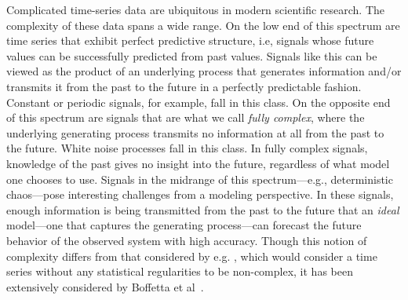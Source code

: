 



%

Complicated time-series data are ubiquitous in modern scientific research.  The
complexity of these data spans a wide range.  On the low end of this spectrum
are time series that exhibit perfect predictive structure, i.e, signals whose
future values can be successfully predicted from past values.  Signals like this
can be viewed as the product of an underlying process that generates information
and/or transmits it from the past to the future in a perfectly predictable
fashion.  Constant or periodic signals, for example, fall in this class.  On the
opposite end of this spectrum are signals that are what we call \emph{fully
complex}, where the underlying generating process transmits no information at
all from the past to the future.  White noise processes fall in this class.  In
fully complex signals, knowledge of the past gives no insight into the future,
regardless of what model one chooses to use. Signals in the midrange of this
spectrum---e.g., deterministic chaos---pose interesting challenges from a
modeling perspective.  In these signals, enough information is being transmitted
from the past to the future that an \emph{ideal} model---one that captures the
generating process---can forecast the future behavior of the observed system
with high accuracy. Though this notion of complexity differs from that
considered by e.g. \cite{Shalizi2008}, which would consider a time series
without any statistical regularities to be non-complex, it has been extensively
considered by Boffetta et al~\cite{boffetta02}.

